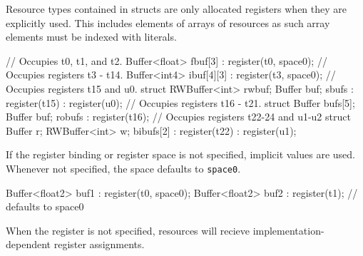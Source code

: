 \begin{note}
Resource types contained in structs are only allocated registers when they are explicitly used.
This includes elements of arrays of resources as such array elements must be indexed with literals.
\end{note}

\begin{HLSL}
  // Occupies t0, t1, and t2.
  Buffer<float> fbuf[3] : register(t0, space0);
  // Occupies registers t3 - t14.
  Buffer<int4> ibuf[4][3] : register(t3, space0);
  // Occupies registers t15 and u0.
  struct {RWBuffer<int> rwbuf; Buffer buf;} sbufs : register(t15) : register(u0);
  // Occupies registers t16 - t21.
  struct {Buffer bufs[5]; Buffer buf;} robufs : register(t16);
  // Occupies registers t22-24 and u1-u2
  struct {Buffer r; RWBuffer<int> w;} bibufs[2] : register(t22) : register(u1);
\end{HLSL}

If the register binding or register space is not specified, implicit values are used.
Whenever not specified, the space defaults to \texttt{space0}.

\begin{HLSL}
  Buffer<float2> buf1 : register(t0, space0);
  Buffer<float2> buf2 : register(t1); // defaults to space0
\end{HLSL}

When the register is not specified, resources will recieve implementation-dependent register assignments.
